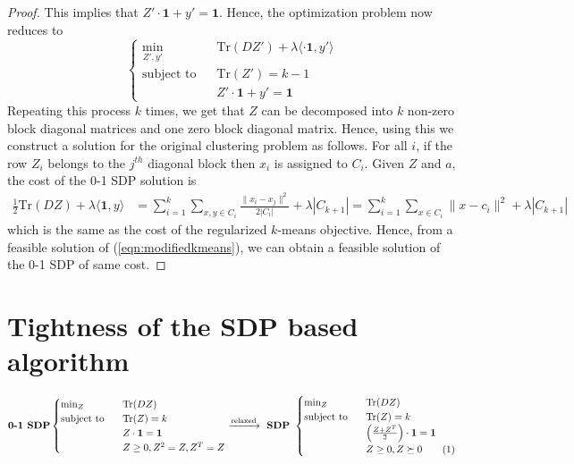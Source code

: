 \documentclass[12pt]{article}
\newcommand{\mb}{\mathbf}
\newcommand{\tr}{\text{Tr}}
\newcommand\numberthis{\addtocounter{equation}{1}\tag{\theequation}}
\begin{document}
\begin{proof}
This implies that $Z'\cdot \mb 1 + y' = \textbf{1}$. Hence, the optimization problem now reduces to
 \[
    \begin{cases}
		\min_{Z',y'} \enspace &\tr(DZ') + \lambda\langle \cdot \mb 1, y'\rangle\\
		\text{subject to } \enspace &\tr(Z') = k-1\\
		&Z'\cdot \mb 1 + y' = \mb 1
	\end{cases}
\]
Repeating this process $k$ times, we get that $Z$ can be decomposed into $k$ non-zero block diagonal matrices and one zero block diagonal matrix. Hence, using this we construct a solution for the original clustering problem as follows. For all $i$, if the row $Z_i$ belongs to the $j^{th}$ diagonal block then $x_i$ is assigned to $C_i$. Given $Z$ and $a$, the cost of the 0-1 SDP solution is
\begin{align*}
\frac{1}{2} \tr(DZ) + \lambda\langle\mb 1, y\rangle &= \sum_{i=1}^k\sum_{x,y \in C_i} \frac{\|x_i-x_j\|^2}{2|C_i|} + \lambda|C_{k+1}| = \sum_{i=1}^k \sum_{x \in C_i} \|x-c_i\|^2 + \lambda |C_{k+1}|
\end{align*}
which is the same as the cost of the regularized $k$-means objective. Hence, from a feasible solution of (\ref{eqn:modifiedkmeans}), we can obtain a feasible solution of the 0-1 SDP of same cost.
\end{proof}

\section{Tightness of the SDP based algorithm}

\begin{equation*}
	\textbf{0-1 SDP} 
	\begin{cases}
		\min_{Z} \enspace &\tr(DZ) \\
		\text{subject to } \enspace &\tr(Z) = k\\
		& Z\cdot \mb 1 = \mb 1\\	
		&Z\ge 0, Z^2 = Z, Z^T = Z 
	\end{cases}
	\xrightarrow{\text{relaxed}} \textbf{ SDP } 
	\begin{cases}
		\min_{Z} \enspace &\tr(DZ)\\
        \text{subject to } \enspace &\tr(Z) = k\\
		& \Big(\frac{Z+Z^T}{2}\Big)\cdot \mb 1 = \mb 1\\		
		&Z \ge 0, Z \succeq 0 \numberthis\label{a-eqn:SDP}
	\end{cases}
\end{equation*}
\end{document}
